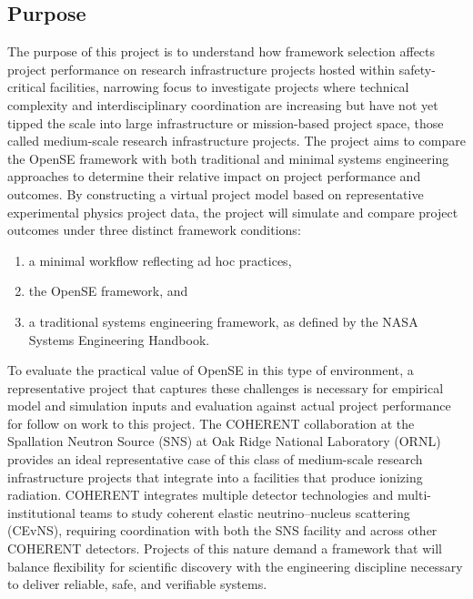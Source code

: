\subsection{Purpose}
\label{sub:purpose}
The purpose of this project is to understand how framework selection affects project performance on research infrastructure projects hosted within safety-critical facilities, narrowing focus to investigate projects where technical complexity and interdisciplinary coordination are increasing but have not yet tipped the scale into large infrastructure or mission-based project space, those called medium-scale research infrastructure projects.
The project aims to compare the OpenSE framework with both traditional and minimal systems engineering approaches to determine their relative impact on project performance and outcomes.
By constructing a virtual project model based on representative experimental physics project data, the project will simulate and compare project outcomes under three distinct framework conditions:
\begin{enumerate}
    \item a minimal workflow reflecting ad hoc practices,
    \item the OpenSE framework, and
    \item a traditional systems engineering framework, as defined by the NASA Systems Engineering Handbook.
\end{enumerate}
To evaluate the practical value of OpenSE in this type of environment, a representative project that captures these challenges is necessary for empirical model and simulation inputs and evaluation against actual project performance for follow on work to this project. 
The COHERENT collaboration at the Spallation Neutron Source (SNS) at Oak Ridge National Laboratory (ORNL) provides an ideal representative case of this class of medium-scale research infrastructure projects that integrate into a facilities that produce ionizing radiation. 
COHERENT integrates multiple detector technologies and multi-institutional teams to study coherent elastic neutrino–nucleus scattering (CEvNS)\cite{ornlCoherent}, requiring coordination with both the SNS facility and across other COHERENT detectors. 
Projects of this nature demand a framework that will balance flexibility for scientific discovery with the engineering discipline necessary to deliver reliable, safe, and verifiable systems.
